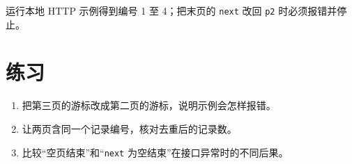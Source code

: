 \begin{tcolorbox}[title=本章验收,colframe=Teal,colback=Teal!3]
运行本地 HTTP 示例得到编号 1 至 4；把末页的 \texttt{next} 改回 \texttt{p2} 时必须报错并停止。
\end{tcolorbox}

\section{练习}
\begin{enumerate}[label=\arabic*.]
\item 把第三页的游标改成第二页的游标，说明示例会怎样报错。
\item 让两页含同一个记录编号，核对去重后的记录数。
\item 比较“空页结束”和“\texttt{next} 为空结束”在接口异常时的不同后果。
\end{enumerate}
